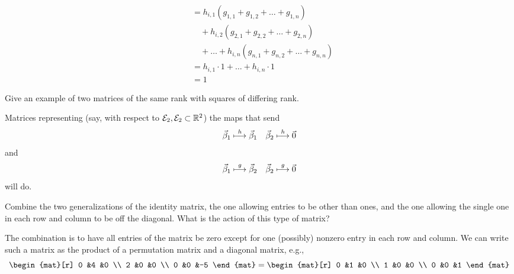 \begin{exercises}
\begin{answer}
\begin{align*}
       &=h_{i,1}(g_{1,1}+g_{1,2}+\dots+g_{1,n})  \\
       &\text{}\quad+h_{i,2}(g_{2,1}+g_{2,2}+\dots+g_{2,n}) \\
       &\text{}\quad
        +\dots+h_{i,n}(g_{n,1}+g_{n,2}+\dots+g_{n,n})  \\
       &=h_{i,1}\cdot 1+\dots+h_{i,n}\cdot 1  \\
       &=1
     \end{align*}  
    \end{answer}
  \recommended \item
    Give an example of two matrices of the same rank with squares of
    differing rank.
    \begin{answer}
      Matrices representing (say, with respect to
      \( {\cal E}_2,{\cal E}_2\subset\mathbb{R}^2 \)) the maps that send
      \begin{equation*}
        \vec{\beta}_1 \stackrel{h}{\longmapsto} \vec{\beta}_1
        \quad
        \vec{\beta}_2 \stackrel{h}{\longmapsto} \vec{0}
      \end{equation*}
      and
      \begin{equation*}
        \vec{\beta}_1 \stackrel{g}{\longmapsto} \vec{\beta}_2
        \quad
        \vec{\beta}_2 \stackrel{g}{\longmapsto} \vec{0}
      \end{equation*}
      will do.  
    \end{answer}
  \item 
    Combine the two generalizations of the identity matrix,
    the one allowing entries to be other than ones, and the one allowing the
    single one in each row and column to be off the diagonal.
    What is the action of this type of matrix?
    \begin{answer}
      The combination is to have all entries of the matrix be zero
      except for one (possibly) nonzero entry in each row and column.
      We can write such a matrix as the product of a permutation matrix and
      a diagonal matrix, e.g.,
      \begin{equation*}
        \begin{mat}[r]
          0  &4  &0  \\
          2  &0  &0  \\
          0  &0  &-5
        \end{mat}
        =\begin{mat}[r]
          0  &1  &0  \\
          1  &0  &0  \\
          0  &0  &1
        \end{mat}

\end{equation*}
\end{answer}
\end{exercises}

